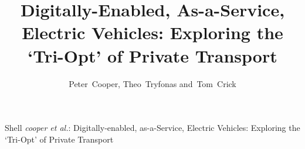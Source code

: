 \documentclass[journal]{IEEEtran}
\begin{document}
%
\title{Digitally-Enabled, As-a-Service, Electric Vehicles: Exploring the `Tri-Opt' of Private Transport}
%
%
%

\author{Peter~Cooper, Theo~Tryfonas and~Tom~Crick}%

% 
%



%
{Shell \MakeLowercase{\textit{Cooper et al.}}: Digitally-enabled,
  as-a-Service, Electric Vehicles: Exploring the `Tri-Opt' of Private
  Transport}
% 
\end{document}

